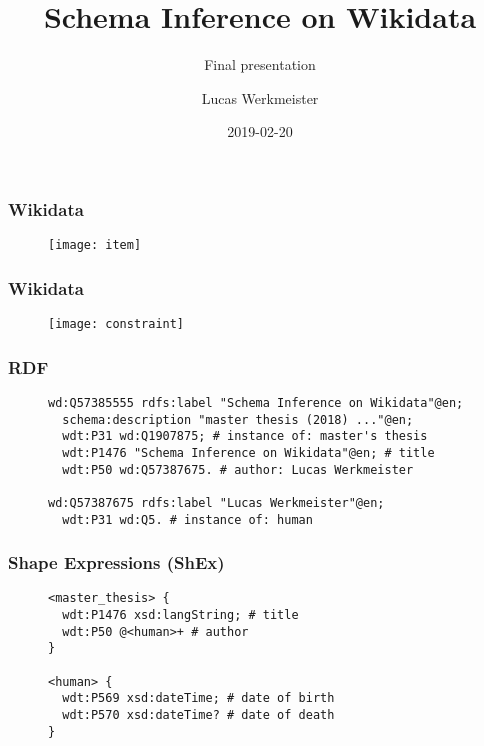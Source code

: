 \documentclass[aspectratio=169]{beamer}
\title{Schema Inference on Wikidata}
\subtitle{Final presentation}
\author{Lucas Werkmeister}
\date{2019-02-20}
\begin{document}
\frame{\titlepage}

\begin{frame}
  \frametitle{Wikidata}
  \begin{figure}
    \texttt{[image: item]}
  \end{figure}
\end{frame}

\begin{frame}
  \frametitle{Wikidata}
  \begin{figure}
    \texttt{[image: constraint]}
  \end{figure}
\end{frame}

\begin{frame}[fragile]
  \frametitle{RDF}
  \begin{figure}
    \begin{lstlisting}[language=sparql]
wd:Q57385555 rdfs:label "Schema Inference on Wikidata"@en;
  schema:description "master thesis (2018) ..."@en;
  wdt:P31 wd:Q1907875; # instance of: master's thesis
  wdt:P1476 "Schema Inference on Wikidata"@en; # title
  wdt:P50 wd:Q57387675. # author: Lucas Werkmeister

wd:Q57387675 rdfs:label "Lucas Werkmeister"@en;
  wdt:P31 wd:Q5. # instance of: human
    \end{lstlisting}
  \end{figure}
\end{frame}

\begin{frame}[fragile]
  \frametitle{Shape Expressions (ShEx)}
  \begin{figure}
    \begin{lstlisting}[language=sparql]
<master_thesis> {
  wdt:P1476 xsd:langString; # title
  wdt:P50 @<human>+ # author
}

<human> {
  wdt:P569 xsd:dateTime; # date of birth
  wdt:P570 xsd:dateTime? # date of death
}
    \end{lstlisting}
  \end{figure}
\end{frame}
\end{document}
